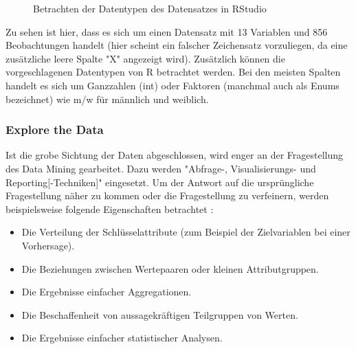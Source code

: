 \begin{figure}[H]
\centering
{}
\caption{Betrachten der Datentypen des Datensatzes in RStudio}
\label{fig:Lasagne_RStudio}
\end{figure}
Zu sehen ist hier, dass es sich um einen Datensatz mit 13 Variablen und 856 Beobachtungen handelt (hier scheint ein falscher Zeichensatz vorzuliegen, da eine zusätzliche leere Spalte "X" angezeigt wird). Zusätzlich können die vorgeschlagenen Datentypen von R betrachtet werden. Bei den meisten Spalten handelt es sich um Ganzzahlen (int) oder Faktoren (manchmal auch als Enums bezeichnet) wie m/w für männlich und weiblich.

\subsubsection{Explore the Data}
Ist die grobe Sichtung der Daten abgeschlossen, wird enger an der Fragestellung des Data Mining gearbeitet. Dazu werden "Abfrage-, Visualisierungs- und Reporting[-Techniken]" \citep[S.~16; eigene Übersetzung]{shearer_crisp-dm_2000} eingesetzt. Um der Antwort auf die ursprüngliche Fragestellung näher zu kommen oder die Fragestellung zu verfeinern, werden beispielsweise folgende Eigenschaften betrachtet \citep[S.~18; eigene Übersetzung]{chapman_crisp-dm_2000}:
\begin{itemize}
\item Die Verteilung der Schlüsselattribute (zum Beispiel der Zielvariablen bei einer Vorhersage).
\item Die Beziehungen zwischen Wertepaaren oder kleinen Attributgruppen.
\item Die Ergebnisse einfacher Aggregationen.
\item Die Beschaffenheit von aussagekräftigen Teilgruppen von Werten.
\item Die Ergebnisse einfacher statistischer Analysen.
\end{itemize}

